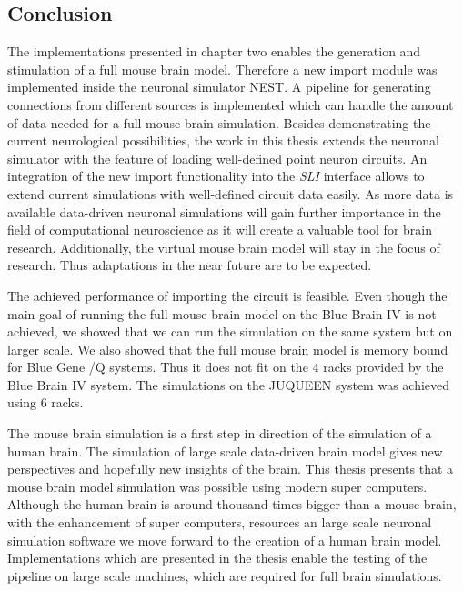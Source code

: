 \subsection{Conclusion}
The implementations presented in chapter two enables the generation and stimulation of a full mouse brain model.
Therefore a new import module was implemented inside the neuronal simulator NEST.
A pipeline for generating connections from different sources is implemented which can handle the amount of data needed for a full mouse brain simulation.
Besides demonstrating the current neurological possibilities, the work in this thesis extends the neuronal simulator with the feature of loading well-defined
point neuron circuits. An integration of the new import functionality into the \emph{SLI}
interface allows to extend current simulations with well-defined circuit data easily. 
As more data is available data-driven neuronal simulations will gain further importance in the field of computational neuroscience as it will create a valuable tool for brain research.
Additionally, the virtual mouse brain model will stay in the focus of research.
Thus adaptations in the near future are to be expected.

The achieved performance of importing the circuit is feasible.
Even though the main goal of running the full mouse brain model on the Blue Brain IV is not achieved,
we showed that we can run the simulation on the same system but on larger scale.
We also showed  that the full mouse brain model is memory bound for Blue Gene /Q systems.
Thus it does not fit on the $4$ racks provided by the Blue Brain IV system. 
The simulations on the JUQUEEN system was achieved using $6$ racks.

The mouse brain simulation is a first step in direction of the simulation of a human brain. The simulation of large scale data-driven brain model gives new perspectives and hopefully new insights of the brain.
This thesis presents that a mouse brain model simulation was possible using modern super computers. Although the human brain is around thousand times bigger than a mouse brain, with the enhancement of super computers, resources an large scale neuronal simulation software we move forward to the creation of a human brain model. 
Implementations which are presented in the thesis enable the testing of the pipeline on
large scale machines, which are required for full brain simulations.



